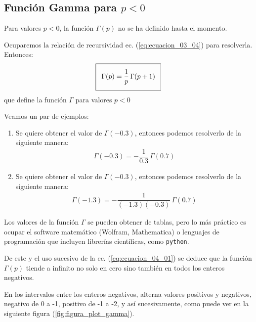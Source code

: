 \subsection{Función Gamma para $p < 0$}
Para valores $p < 0$, la función $\Gamma (p)$ no se ha definido hasta el momento.
\par
Ocuparemos la relación de recursividad ec. (\ref{eq:ecuacion_03_04}) para resolverla. Entonces:
\begin{align}\addtolength{\fboxsep}{5pt}\boxed{
\Gamma (p) = \dfrac{1}{p} \, \Gamma (p + 1)}
\label{eq:ecuacion_04_01}
\end{align}
que define la función $\Gamma$ para valores $p < 0$
\par
Veamos un par de ejemplos: 
\begin{enumerate}
\item  Se quiere obtener el valor de $\Gamma (-0.3)$, entonces podemos resolverlo de la siguiente manera:
\begin{align*}
\Gamma (-0.3) = - \dfrac{1}{0.3} \, \Gamma (0.7)
\end{align*}
\item  Se quiere obtener el valor de $\Gamma (-0.3)$, entonces podemos resolverlo de la siguiente manera:
\begin{align*}
\Gamma (-1.3) = - \dfrac{1}{(-1.3)(-0.3)} \, \Gamma (0.7)
\end{align*}
\end{enumerate}
Los valores de la función $\Gamma$ se pueden obtener de tablas, pero lo más práctico es ocupar el software matemático (Wolfram, Mathematica) o lenguajes de programación que incluyen librerías científicas, como \texttt{python}.
\par
De este y el uso sucesivo de la ec. (\ref{eq:ecuacion_04_01}) se deduce que la función $\Gamma (p)$ tiende a infinito no solo en cero sino también en todos los enteros negativos.
\par
En los intervalos entre los enteros negativos, alterna valores positivos y negativos, negativo de 0 a -1, positivo de -1 a -2, y así sucesivamente, como puede ver en la siguiente figura (\ref{fig:figura_plot_gamma}).
